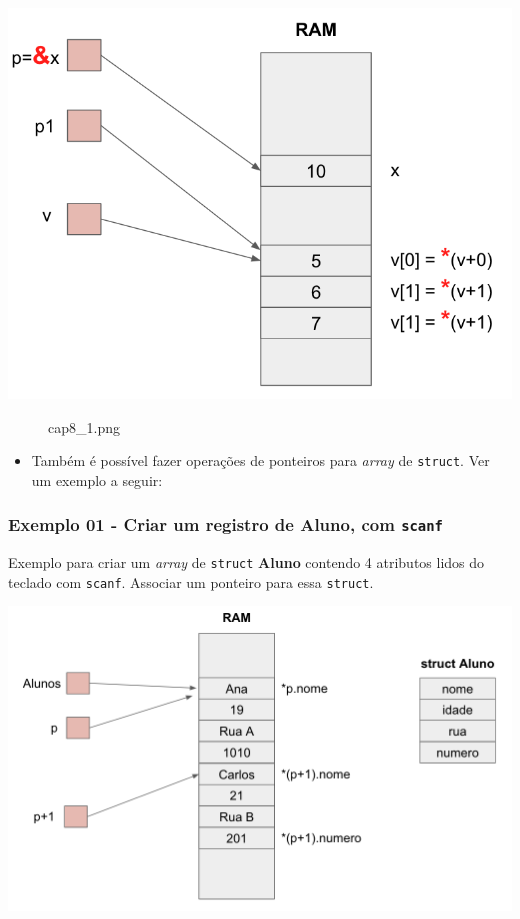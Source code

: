 \documentclass[12pt,a4paper]{article}
\providecommand{\tightlist}{%
      \setlength{\itemsep}{0pt}\setlength{\parskip}{0pt}}
\begin{document}
\includegraphics{"figs/cap8_1.png"}

    \begin{figure}
\centering
\caption{cap8\_1.png}
\end{figure}

    \begin{itemize}
\tightlist
\item
  Também é possível fazer operações de ponteiros para \emph{array} de
  \texttt{struct}. Ver um exemplo a seguir:
\end{itemize}

    \hypertarget{exemplo-01---criar-um-registro-de-aluno-com-scanf}{%
\subsubsection{\texorpdfstring{Exemplo 01 - Criar um registro de Aluno,
com
\texttt{scanf}}{Exemplo 01 - Criar um registro de Aluno, com scanf}}\label{exemplo-01---criar-um-registro-de-aluno-com-scanf}}

Exemplo para criar um \emph{array} de \texttt{struct} \textbf{Aluno}
contendo 4 atributos lidos do teclado com \texttt{scanf}. Associar um
ponteiro para essa \texttt{struct}.

\includegraphics{"figs/cap8_2.png"}
\end{document}
